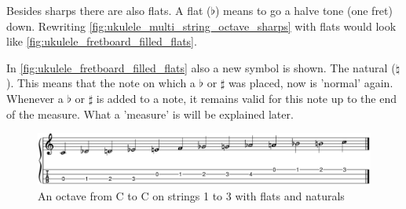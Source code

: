 \newpage

Besides sharps there are also flats. A flat ($\flat$) means to go a halve tone (one fret) down. Rewriting \autoref{fig:ukulele_multi_string_octave_sharps} with flats would look like \autoref{fig:ukulele_fretboard_filled_flats}.

In \autoref{fig:ukulele_fretboard_filled_flats} also a new symbol is shown. The natural ($\natural$). This means that the note on which a $\flat$ or $\sharp$ was placed, now is 'normal' again. Whenever a $\flat$ or $\sharp$ is added to a note, it remains valid for this note up to the end of the measure. What a 'measure' is will be explained later.

\begin{figure}[h]
    \centering
    \includegraphics[width=\textwidth]{../../MuseScore/Ukulele/UkuleleChromaticNotesFlatsMultiString.png}
    \caption{An octave from C to C on strings 1 to 3 with flats and naturals}
    \label{fig:ukulele_fretboard_filled_flats}
\end{figure}